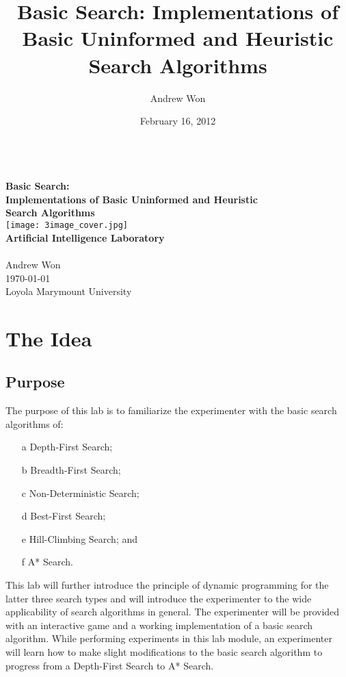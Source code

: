 \documentclass[11pt]{article}
\title{Basic Search:
    Implementations of Basic Uninformed and Heuristic Search Algorithms}
\author{Andrew Won}
\date{February 16, 2012}
\begin{document}
\thispagestyle{plain}

\begin{center}
\textbf{\Large
\vspace{11mm}\\
Basic Search:\\
Implementations of Basic Uninformed and Heuristic\\Search Algorithms}
\vspace{11mm}\\
\texttt{[image: 3image\_cover.jpg]}
\vspace{11mm}\\
\textbf{\Large Artificial Intelligence Laboratory}
\vspace{11mm}\\
\vspace{15mm}\\
Andrew Won\\
\today\\
Loyola Marymount University
\end{center}

\newpage
\thispagestyle{fancy}

\chapter{The Idea}
\section{Purpose}
The purpose of this lab is to familiarize the experimenter with the basic 
search algorithms of:

\begin{enumerate}
  \item[a] Depth-First Search;
  \item[b] Breadth-First Search;
  \item[c] Non-Deterministic Search;
  \item[d] Best-First Search;
  \item[e] Hill-Climbing Search; and
  \item[f] A* Search.
\end{enumerate}

This lab will further introduce the principle of dynamic programming for the
latter three search types and will introduce the experimenter to the wide 
applicability of search algorithms in general.  The experimenter will be 
provided with an interactive game and a working implementation of a basic 
search algorithm.  While performing experiments in this lab module, an 
experimenter will learn how to make slight modifications to the basic search 
algorithm to progress from a Depth-First Search to A* Search.
\end{document}
